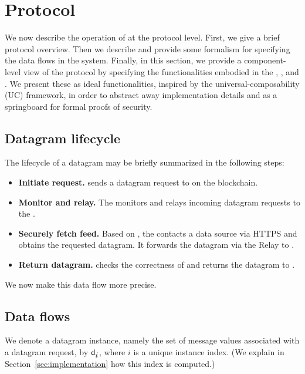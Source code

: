 

\section{\tc Protocol}

We now describe the operation of \tc at the protocol level. First, we give a brief protocol overview. Then we describe and provide some formalism for specifying the data flows in the system. Finally, in this section, we provide a component-level view of the protocol by specifying the functionalities embodied in the \tcontract, \medname, and \encname. We present these  as ideal functionalities, inspired by the universal-composability (UC) framework, in order to abstract away implementation details and as a springboard for formal proofs of security.

\subsection{Datagram lifecycle}

The lifecycle of a datagram may be briefly summarized in the following steps:

\begin{itemize}
\item {\bf Initiate request.} \reqcont sends a datagram request to \tcont on the blockchain.

\item {\bf Monitor and relay.} The \medname monitors \tcont and relays incoming datagram requests to the \encname.

\item {\bf Securely fetch feed.} Based on \dgform, the \encname contacts a data source via HTTPS and obtains the requested datagram. It forwards the datagram via the Relay to \tcont.

\item {\bf Return datagram.} \tcont checks the correctness of \dgform and returns the datagram to \reqcont.
\end{itemize}

We now make this data flow more precise. 

\subsection{Data flows}

We denote a datagram instance, namely the set of message values associated with a datagram request, by ${\sf d_{\mbox{$i$}}}$, where $i$ is a unique instance index. (We explain in Section~\ref{sec:implementation} how this index is computed.) 

